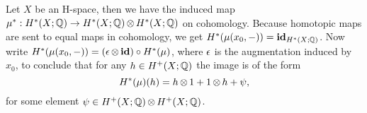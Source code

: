 
Let $X$ be an H-space, then we have the induced map $\mu^\ast: H^\ast(X; \mathbb{Q}) \to H^\ast(X; \mathbb{Q}) \operatorname*{\otimes} H^\ast(X; \mathbb{Q})$ on cohomology. Because homotopic maps are sent to equal maps in cohomology, we get $H^\ast(\mu(x_0, -)) = \mathbf{id}_{H^\ast(X; \mathbb{Q})}$. Now write $H^\ast(\mu(x_0, -)) = (\epsilon \operatorname*{\otimes} \mathbf{id}) \circ H^\ast(\mu)$, where $\epsilon$ is the augmentation induced by $x_0$, to conclude that for any $h \in H^{+}(X; \mathbb{Q})$ the image is of the form
$$ H^\ast(\mu)(h) = h \operatorname*{\otimes} 1 + 1 \operatorname*{\otimes} h + \psi, $$
for some element $\psi \in H^{+}(X; \mathbb{Q}) \operatorname*{\otimes} H^{+}(X; \mathbb{Q})$.

